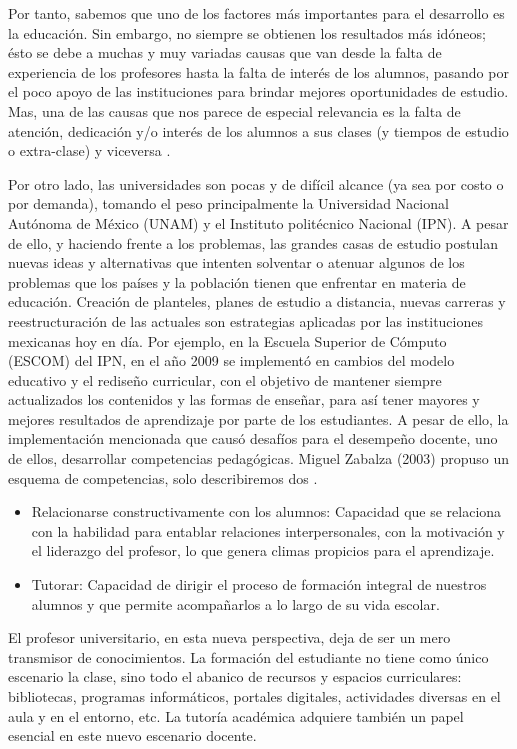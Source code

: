 \noindent
Por tanto, sabemos que uno de los factores más importantes para el desarrollo es la educación. Sin embargo, 
no siempre se obtienen los resultados más idóneos; ésto se debe a muchas y muy variadas causas que van 
desde la falta de experiencia de los profesores hasta la falta de interés de los alumnos, pasando por el 
poco apoyo de las instituciones para brindar mejores oportunidades de estudio. Mas, una de las causas 
que nos parece de especial relevancia es la falta de atención, dedicación y/o interés de los alumnos a sus 
clases (y tiempos de estudio o extra-clase) y viceversa \cite{UV}. 

\noindent
Por otro lado, las universidades son pocas y de difícil alcance (ya sea por costo o por demanda), tomando 
el peso principalmente la Universidad Nacional Autónoma de México (UNAM) y el Instituto politécnico Nacional 
(IPN). A pesar de ello, y haciendo frente a los problemas, las grandes casas de estudio postulan nuevas ideas 
y alternativas que intenten solventar o atenuar algunos de los problemas que los países y la población tienen 
que enfrentar en materia de educación. 
Creación de planteles, planes de estudio a distancia, nuevas carreras y reestructuración de las actuales son 
estrategias aplicadas por las instituciones mexicanas hoy en día. Por ejemplo, en la Escuela Superior de 
Cómputo (ESCOM) del IPN, en el año 2009 se implementó en cambios del modelo educativo y el rediseño curricular, 
con el objetivo de mantener siempre actualizados los contenidos y las formas de enseñar, para así tener mayores
y mejores resultados de aprendizaje por parte de los estudiantes. 
A pesar de ello, la implementación mencionada que causó desafíos para el desempeño docente, uno de ellos, 
desarrollar competencias pedagógicas. Miguel Zabalza (2003) propuso un esquema de competencias, solo 
describiremos dos \cite{Competencias}.

\begin{itemize}	
	\item Relacionarse constructivamente con los alumnos: Capacidad que se relaciona con la habilidad 
	para entablar relaciones  interpersonales, con la motivación y el liderazgo del profesor, lo que  
	genera climas propicios para el  aprendizaje.
	\item Tutorar: Capacidad de dirigir el proceso de formación integral de nuestros alumnos y que 
	permite acompañarlos a lo largo de su vida escolar.
\end{itemize}

\noindent
El profesor universitario, en esta nueva perspectiva, deja de ser un mero transmisor de conocimientos. La 
formación del estudiante no tiene como único escenario la clase, sino todo el abanico de recursos y espacios 
curriculares: bibliotecas, programas informáticos, portales digitales, actividades diversas en el aula y 
en el entorno, etc. La tutoría académica adquiere también un papel esencial en este nuevo escenario docente. 
\cite{UAB}

